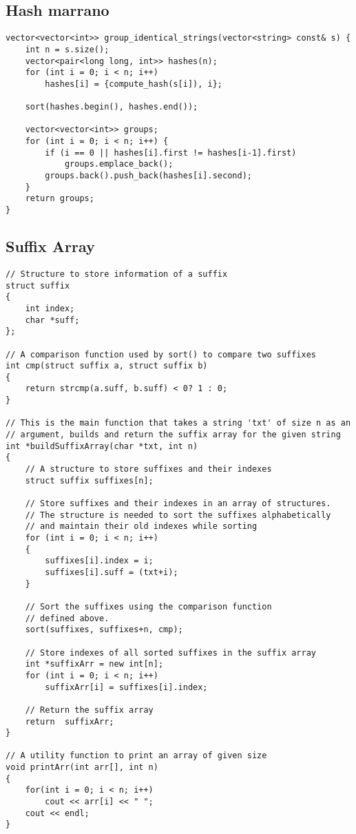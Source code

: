 \documentclass{article}
\begin{document}
\subsection{Hash marrano}

\begin{lstlisting}
vector<vector<int>> group_identical_strings(vector<string> const& s) {
    int n = s.size();
    vector<pair<long long, int>> hashes(n);
    for (int i = 0; i < n; i++)
        hashes[i] = {compute_hash(s[i]), i};

    sort(hashes.begin(), hashes.end());

    vector<vector<int>> groups;
    for (int i = 0; i < n; i++) {
        if (i == 0 || hashes[i].first != hashes[i-1].first)
            groups.emplace_back();
        groups.back().push_back(hashes[i].second);
    }
    return groups;
}
\end{lstlisting}

\subsection{Suffix Array}

\begin{lstlisting}
// Structure to store information of a suffix
struct suffix
{
    int index;
    char *suff;
};
 
// A comparison function used by sort() to compare two suffixes
int cmp(struct suffix a, struct suffix b)
{
    return strcmp(a.suff, b.suff) < 0? 1 : 0;
}
 
// This is the main function that takes a string 'txt' of size n as an
// argument, builds and return the suffix array for the given string
int *buildSuffixArray(char *txt, int n)
{
    // A structure to store suffixes and their indexes
    struct suffix suffixes[n];
 
    // Store suffixes and their indexes in an array of structures.
    // The structure is needed to sort the suffixes alphabetically
    // and maintain their old indexes while sorting
    for (int i = 0; i < n; i++)
    {
        suffixes[i].index = i;
        suffixes[i].suff = (txt+i);
    }
 
    // Sort the suffixes using the comparison function
    // defined above.
    sort(suffixes, suffixes+n, cmp);
 
    // Store indexes of all sorted suffixes in the suffix array
    int *suffixArr = new int[n];
    for (int i = 0; i < n; i++)
        suffixArr[i] = suffixes[i].index;
 
    // Return the suffix array
    return  suffixArr;
}
 
// A utility function to print an array of given size
void printArr(int arr[], int n)
{
    for(int i = 0; i < n; i++)
        cout << arr[i] << " ";
    cout << endl;
}
\end{lstlisting}
\end{document}
